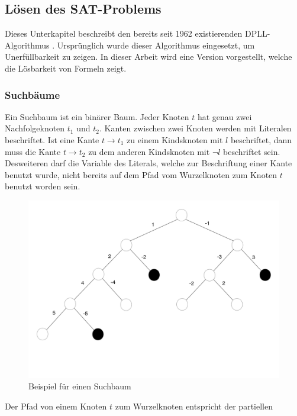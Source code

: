 \subsection{Lösen des SAT-Problems}
\label{sec:sat_algo}
Dieses Unterkapitel beschreibt den bereits seit 1962
existierenden DPLL-Algorithmus \cite{davis:1960}.
Ursprünglich wurde dieser 
Algorithmus eingesetzt, um Unerfüllbarkeit zu zeigen. 
In dieser Arbeit wird eine Version vorgestellt, welche die
Lösbarkeit von Formeln zeigt.\\

\subsubsection{Suchbäume}
Ein Suchbaum ist ein binärer Baum. Jeder Knoten $t$ hat
genau zwei Nachfolgeknoten $t_1$ und $t_2$. Kanten zwischen zwei Knoten werden
mit Literalen beschriftet. Ist eine Kante $t \rightarrow t_1$ zu einem
Kindsknoten mit $l$ beschriftet, dann muss die Kante $t \rightarrow t_2$
zu dem anderen Kindsknoten mit $\neg l$ beschriftet sein. Desweiteren
darf die Variable des Literals, welche zur Beschriftung einer Kante benutzt
wurde, nicht bereits auf dem Pfad vom Wurzelknoten zum Knoten $t$ benutzt
worden sein.
 \begin{figure}[h]
    \centering
    \includegraphics[width=\textwidth]{abb/suchbaum.png}
    \caption{Beispiel für einen Suchbaum}
    \label{suchbaum}
  \end{figure}
Der Pfad von einem Knoten $t$ zum Wurzelknoten entspricht der partiellen
